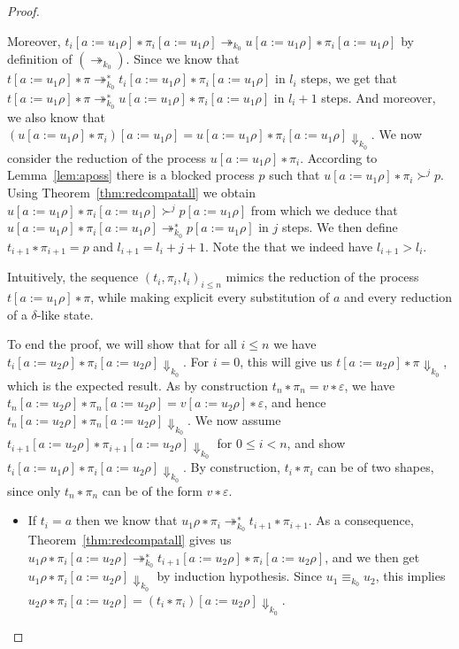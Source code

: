 \begin{proof}
\begin{itemize}
      Moreover, ${t_i[a := u_1ρ] ∗ π_i[a := u_1ρ]} ↠_{k_0}
      {u[a := u_1ρ] ∗ π_i[a := u_1ρ]}$ by definition of $({↠}_{k_0})$. Since
      we know that ${t[a := u_1ρ] ∗ π} ↠_{k_0}^{∗} {t_i[a := u_1ρ] ∗ π_i[a :=
      u_1ρ]}$ in $l_i$ steps, we get that ${t[a := u_1ρ] ∗ π} ↠_{k_0}^{∗}
      {u[a := u_1ρ] ∗ π_i[a := u_1ρ]}$ in $l_i+1$ steps. And moreover, we also
      know that ${(u[a := u_1ρ] ∗ π_i)[a := u_1ρ]} = {u[a := u_1ρ] ∗ π_i[a :=
      u_1ρ]} {⇓}_{k_0}$.
      We now consider the reduction of the process ${u[a := u_1ρ]∗π_i}$.
      According to Lemma~\ref{lem:aposs} there is a blocked process $p$ such
      that ${u[a := u_1ρ]∗π_i} ≻^j p$. Using Theorem~\ref{thm:redcompatall} we
      obtain ${u[a := u_1ρ] ∗ π_i[a := u_1ρ]} ≻^j {p[a := u_1ρ]}$ from which
      we deduce that ${u[a := u_1ρ] ∗ π_i[a := u_1ρ]} ↠_{k_0}^{∗} {p[a :=
      u_1ρ]}$ in $j$ steps. We then define ${t_{i+1} ∗ π_{i+1}} = p$ and
      $l_{i+1} = l_i + j + 1$. Note the that we indeed have $l_{i+1} > l_i$.
  \end{itemize}
  Intuitively, the sequence $(t_i,π_i,l_i)_{i ≤ n}$ mimics the reduction of
  the process $t[a := u_1ρ] ∗ π$, while making explicit every substitution of
  $a$ and every reduction of a $δ$-like state.

  To end the proof, we will show that for all $i ≤ n$ we have
  ${t_i[a := u_2ρ] ∗ π_i[a := u_2ρ]} {⇓}_{k_0}$. For $i = 0$, this will give
  us ${t[a := u_2ρ]∗π} {⇓}_{k_0}$, which is the expected result. As by
  construction ${t_n ∗ π_n} = {v ∗ ε}$, we have ${t_n[a := u_2ρ] ∗ π_n[a :=
  u_2ρ]} = {v[a := u_2ρ]∗ε}$, and hence ${t_n[a := u_2ρ] ∗ π_n[a := u_2ρ]}
  {⇓}_{k_0}$.
  We now assume ${t_{i+1}[a := u_2ρ] ∗ π_{i+1}[a := u_2ρ]} {⇓}_{k_0}$ for
  $0 ≤ i < n$, and show ${t_i[a := u_1ρ] ∗ π_i[a := u_2ρ]} {⇓}_{k_0}$.
  By construction, $t_i ∗ π_i$ can be of two shapes, since only $t_n ∗ π_n$
  can be of the form $v ∗ ε$.
  \begin{itemize}
    \item If $t_i = a$ then we know that ${u_1ρ ∗ π_i} ↠_{k_0}^{∗}
      {t_{i+1} ∗ π_{i+1}}$. As a consequence, Theorem~\ref{thm:redcompatall}
      gives us ${u_1ρ ∗ π_i[a := u_2ρ]} ↠_{k_0}^{∗} {t_{i+1}[a := u_2ρ] ∗
      π_i[a := u_2ρ]}$, and we then get ${u_1ρ ∗ π_i[a := u_2ρ]} {⇓}_{k_0}$
      by induction hypothesis. Since $u_1 ≡_{k_0} u_2$, this implies
      ${u_2ρ ∗ π_i[a := u_2ρ]} = {(t_i ∗ π_i)[a := u_2ρ]} {⇓}_{k_0}$.


\end{itemize}
\end{proof}
